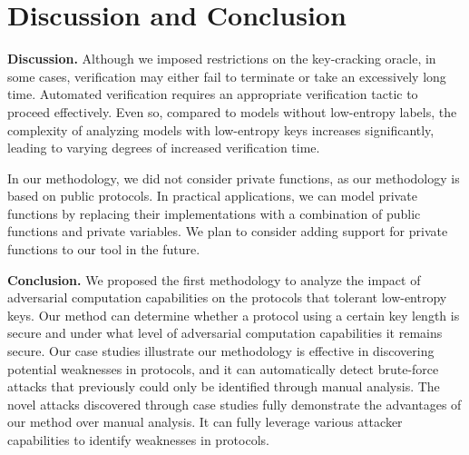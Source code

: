 \documentclass[../main.tex]{subfiles}  %
\begin{document}
\section{Discussion and Conclusion} \label{sec:8discussion-conclusion}
\noindent
\textbf{Discussion.}
Although we imposed restrictions on the key-cracking oracle, in some cases, verification may either fail to terminate or take an excessively long time. 
Automated verification requires an appropriate verification tactic to proceed effectively. 
Even so, compared to models without low-entropy labels, the complexity of analyzing models with low-entropy keys increases significantly, leading to varying degrees of increased verification time.

In our methodology, we did not consider private functions, as our methodology is based on public protocols. 
In practical applications, we can model private functions by replacing their implementations with a combination of public functions and private variables. 
We plan to  consider adding support for private functions to our tool in the future.

\noindent
\textbf{Conclusion.} 
We proposed the first methodology to analyze the impact of adversarial computation capabilities on the protocols that tolerant low-entropy keys. 
Our method can determine whether a protocol using a certain key length is secure and under what level of adversarial computation capabilities  it remains secure.
Our case studies illustrate our methodology is effective in discovering potential weaknesses in protocols, and it can automatically detect brute-force attacks that previously could only be identified through manual analysis.
The novel attacks discovered through case studies fully demonstrate the advantages of our method over manual analysis.
It can fully leverage various attacker capabilities to identify weaknesses in protocols.
\end{document}
